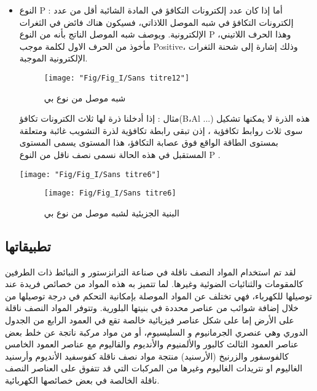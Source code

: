 \begin{enumerate}
\begin{itemize}
		\item 
		النوع P : أما إذا كان عدد إلكترونات التكافؤ في المادة الشائبة أقل من عدد إلكترونات التكافؤ في شبه الموصل اللاذاتي، فسيكون هناك فائض في الثغرات الإلكترونية. ويوصف شبه الموصل الناتج بأنه من النوع P ،وهذا الحرف اللاتيني مأخوذ من الحرف الاول لكلمة موجب Positive، وذلك إشارة إلى شحنة الثغرات الإلكترونية الموجبة.
		
		\begin{figure}[bh]
			\centering
			\texttt{[image: "Fig/Fig\_I/Sans titre12"]}
			\caption{ شبه موصل من نوع بي}
			\label{fig:sans-titre12}
		\end{figure}
		
		مثال : إذا أدخلنا ذرة لها ثلاث الكترونات تكافؤ(B،Al ...) هذه الذرة لا يمكنها تشكيل سوى ثلاث روابط تكافؤية ، إذن تبقى رابطة تكافؤية لذرة التشويب غائبة ومتعلقة بمستوى الطاقة الواقع فوق عصابة التكافؤ، هذا المستوى يسمى المستوى المستقبل في هذه الحالة نسمى نصف ناقل من النوع P .
		\begin{figure*}[h!]
			\centering
			\texttt{[image: "Fig/Fig\_I/Sans titre6"]}
			\caption{}
			\label{fig:sans-titre6}
		\end{figure*}
		
		\begin{figure}[h!]
			\centering
			\texttt{[image: Fig/Fig\_I/Sans titre6]}
			\caption{البنية الجزيئية لشبه موصل من نوع بي}
			\label{fig:sans-titre6}
		\end{figure}
		
	\end{itemize}
	
\end{enumerate}

\subsection{ تطبيقاتها}

لقد تم استخدام المواد النصف ناقلة في صناعة الترانزستور و النبائط ذات الطرفين كالمقومات والثنائيات الضوئية وغيرها. 
لما تتميز به هذه المواد من خصائص فريدة عند توصيلها للكهرباء، فهي تختلف عن المواد الموصلة بإمكانية التحكم في 
درجة توصيلها من خلال إضافة شوائب من عناصر محددة في بنيتها البلورية. وتتوفر المواد النصف ناقلة على الأرض إما على 
شكل عناصر فيزيائية خالصة تقع في العمود الرابع من الجدول الدوري وهي عنصري الجرمانيوم و السليسيوم، أو من مواد مركبة 
ناتجة عن خلط بعض عناصر العمود الثالث كالبور والألمنيوم والأنديوم والقاليوم مع عناصر العمود الخامس كالفوسفور والزرنيخ 
(الأرسنيد) منتجة مواد نصف ناقلة كفوسفيد الأنديوم وأرسنيد الغاليوم او نتريدات الغاليوم وغيرها من المركبات التي قد تتفوق على العناصر النصف ناقلة الخالصة في بعض خصائصها الكهربائية.\\

